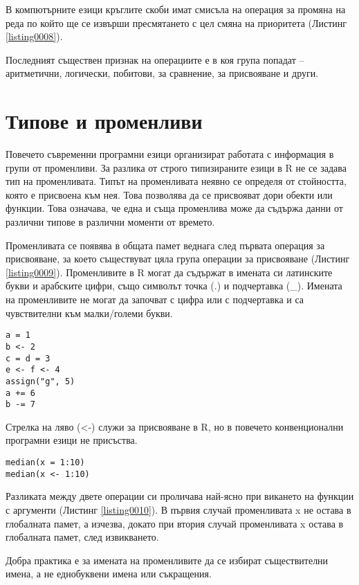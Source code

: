 В компютърните езици кръглите скоби имат смисъла на операция за промяна на реда по който ще се извърши пресмятането с цел смяна на приоритета (Листинг \ref{listing0008}).

Последният съществен признак на операциите е в коя група попадат – аритметични, логически, побитови, за сравнение, за присвояване и други.

\section{Типове и променливи}

Повечето съвременни програмни езици организират работата с информация в групи от променливи. За разлика от строго типизираните езици в R не се задава тип на променливата. Типът на променливата неявно се определя от стойността, която е присвоена към нея. Това позволява да се присвояват дори обекти или функции. Това означава, че една и съща променлива може да съдържа данни от различни типове в различни моменти от времето. 

Променливата се появява в общата памет веднага след първата операция за присвояване, за което съществуват цяла група операции за присвояване (Листинг \ref{listing0009}). Променливите в R могат да съдържат в имената си латинските букви и арабските цифри, също символът точка (.) и подчертавка (\_). Имената на променливите не могат да започват с цифра или с подчертавка и са чувствителни към малки/големи букви. 

\begin{lstlisting}[caption=Операции за присвояване, label=listing0009]
a = 1
b <- 2
c = d = 3
e <- f <- 4
assign("g", 5)
a += 6
b -= 7
\end{lstlisting}

Стрелка на ляво (<-) служи за присвояване в R, но в повечето конвенционални програмни езици не присъства. 

\begin{lstlisting}[caption=Алтернативи за операцията присвояване, label=listing0010]
median(x = 1:10)
median(x <- 1:10)
\end{lstlisting}

Разликата между двете операции си проличава най-ясно при викането на функции с аргументи (Листинг \ref{listing0010}). В първия случай променливата x не остава в глобалната памет, а изчезва, докато при втория случай променливата x остава в глобалната памет, след извикването. 

Добра практика е за имената на променливите да се избират съществителни имена, а не еднобуквени имена или съкращения. 

